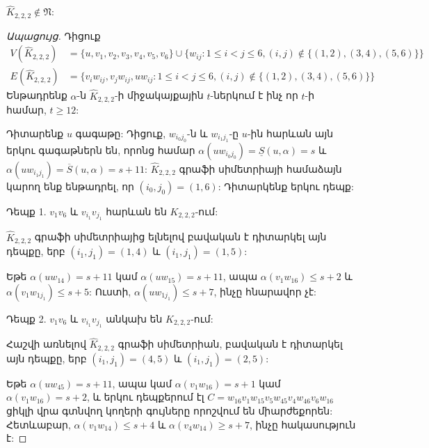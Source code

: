 \begin{theorem}
\label{t3_subdivision_K222} $\widehat{K}_{2,2,2}\notin \mathfrak{N}$:
\end{theorem}
\begin{proof}[Ապացույց]
Դիցուք
\begin{align*}
V(\widehat{K}_{2,2,2}) &=\{u,v_{1},v_{2},v_{3},v_{4},v_{5},v_{6}\}\cup
\{w_{ij}:1\leq i<j\leq 6,(i,j)\notin \{(1,2),(3,4),(5,6)\}\}\\
E(\widehat{K}_{2,2,2}) &=\{v_{i}w_{ij},v_{j}w_{ij},uw_{ij}:1\leq
i<j\leq 6,(i,j)\notin \{(1,2),(3,4),(5,6)\}\}
\end{align*}
Ենթադրենք $\alpha$-ն $\widehat{K}_{2,2,2}$-ի միջակայքային $t$-ներկում է ինչ որ $t$-ի համար, $t\geq 12$:

Դիտարենք $u$ գագաթը: Դիցուք, $w_{i_{0}j_{0}}$-ն և $w_{i_{1}j_{1}}$-ը $u$-ին հարևան այն երկու գագաթներն են, որոնց համար
$\alpha(uw_{i_{0}j_{0}})=\underline{S}(u,\alpha)=s$ և
$\alpha(uw_{i_{1}j_{1}})=\overline{S}(u,\alpha)=s+11$: $\widehat{K}_{2,2,2}$ գրաֆի սիմետրիայի համաձայն կարող ենք ենթադրել, որ 
$(i_{0},j_{0})=(1,6)$: Դիտարկենք երկու դեպք:

Դեպք 1. $v_{1}v_{6}$ և $v_{i_{1}}v_{j_{1}}$ հարևան են 
$K_{2,2,2}$-ում:

$\widehat{K}_{2,2,2}$ գրաֆի սիմետրիայից ելնելով բավական է դիտարկել այն դեպքը, երբ $(i_{1},j_{1})=(1,4)$ և $(i_{1},j_{1})=(1,5)$:

Եթե $\alpha(uw_{14})=s+11$ կամ $\alpha(uw_{15})=s+11$, ապա
$\alpha(v_{1}w_{16})\leq s+2$ և $\alpha(v_{1}w_{1j_{1}})\leq s+5$:
Ուստի, $\alpha(uw_{1j_{1}})\leq s+7$, ինչը հնարավոր չէ:

Դեպք 2. $v_{1}v_{6}$ և $v_{i_{1}}v_{j_{1}}$ անկախ են $K_{2,2,2}$-ում:

Հաշվի առնելով $\widehat{K}_{2,2,2}$ գրաֆի սիմետրիան, բավական է դիտարկել այն դեպքը, երբ $(i_{1},j_{1})=(4,5)$ և $(i_{1},j_{1})=(2,5)$:

Եթե $\alpha(uw_{45})=s+11$, ապա կամ $\alpha(v_{1}w_{16})=s+1$ կամ
$\alpha(v_{1}w_{16})=s+2$, և երկու դեպքերում էլ 
$C=w_{16}v_{1}w_{15}v_{5}w_{45}v_{4}w_{46}v_{6}w_{16}$ ցիկլի վրա գտնվող կողերի գույները որոշվում են միարժեքորեն:
Հետևաբար, $\alpha(v_{1}w_{14})\leq s+4$ և
$\alpha(v_{4}w_{14})\geq s+7$, ինչը հակասություն է:


\end{proof}
